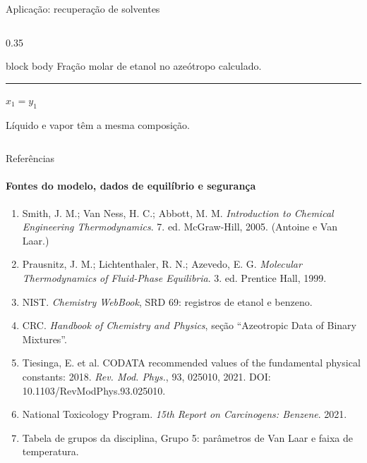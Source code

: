 \documentclass[aspectratio=169,11pt]{beamer}
\begin{document}
\begin{frame}[t]{Aplicação: recuperação de solventes}
\begin{columns}[T,onlytextwidth]
\begin{column}{0.35\textwidth}
\begin{beamercolorbox}[wd=\linewidth,sep=0.30cm]{block body}
        {\fontsize{11}{14}\selectfont Fração molar de etanol no azeótropo calculado.}\par
        \vspace{0.28cm}
        {\color{PrismGold}\rule{1.1cm}{1.4pt}}\par
        \vspace{0.22cm}
        {\fontsize{11}{14}\selectfont $x_1=y_1$\par\vspace{0.12cm}
        Líquido e vapor têm a mesma composição.}
      \end{beamercolorbox}
    \end{column}
  \end{columns}
\end{frame}

\begin{frame}[t]{Referências}
  \framesubtitle{Fontes do modelo, dados de equilíbrio e segurança}
  \vspace{0.14cm}
  \fontsize{9}{11.5}\selectfont
  \begin{enumerate}
    \setlength{\itemsep}{0.21cm}
    \item Smith, J. M.; Van Ness, H. C.; Abbott, M. M. \textit{Introduction to Chemical Engineering
      Thermodynamics}. 7. ed. McGraw-Hill, 2005. (Antoine e Van Laar.)
    \item Prausnitz, J. M.; Lichtenthaler, R. N.; Azevedo, E. G. \textit{Molecular Thermodynamics of
      Fluid-Phase Equilibria}. 3. ed. Prentice Hall, 1999.
    \item NIST. \textit{Chemistry WebBook}, SRD 69: registros de etanol e benzeno.
    \item CRC. \textit{Handbook of Chemistry and Physics}, seção “Azeotropic Data of Binary Mixtures”.
    \item Tiesinga, E. et al. CODATA recommended values of the fundamental physical constants: 2018.
      \textit{Rev. Mod. Phys.}, 93, 025010, 2021. DOI: 10.1103/RevModPhys.93.025010.
    \item National Toxicology Program. \textit{15th Report on Carcinogens: Benzene}. 2021.
    \item Tabela de grupos da disciplina, Grupo 5: parâmetros de Van Laar e faixa de temperatura.
  \end{enumerate}
\end{frame}
\end{document}
